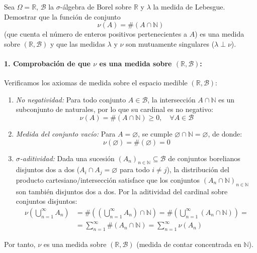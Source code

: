 \begin{problema}
Sea $\Omega = \mathbb{R}$, $\mathcal{B}$ la $\sigma$-álgebra de Borel sobre $\mathbb{R}$ y $\lambda$ la medida de Lebesgue. Demostrar que la función de conjunto
\[
    \nu(A) = \#(A \cap \mathbb{N})
\]
(que cuenta el número de enteros positivos pertenecientes a $A$) es una medida sobre $(\mathbb{R}, \mathcal{B})$ y que las medidas $\lambda$ y $\nu$ son mutuamente singulares ($\lambda \perp \nu$).

\tcblower

\paragraph{1. Comprobación de que $\nu$ es una medida sobre $(\mathbb{R}, \mathcal{B})$:}
Verificamos los axiomas de medida sobre el espacio medible $(\mathbb{R}, \mathcal{B})$:
\begin{enumerate}[label=\alph*)]
    \item \textit{No negatividad:} Para todo conjunto $A \in \mathcal{B}$, la intersección $A \cap \mathbb{N}$ es un subconjunto de naturales, por lo que su cardinal es no negativo:
    \[
        \nu(A) = \#(A \cap \mathbb{N}) \ge 0, \quad \forall A \in \mathcal{B}
    \]
    \item \textit{Medida del conjunto vacío:} Para $A = \varnothing$, se cumple $\varnothing \cap \mathbb{N} = \varnothing$, de donde:
    \[
        \nu(\varnothing) = \#(\varnothing) = 0
    \]
    \item \textit{$\sigma$-aditividad:} Dada una sucesión $(A_n)_{n \in \mathbb{N}} \subseteq \mathcal{B}$ de conjuntos borelianos disjuntos dos a dos ($A_i \cap A_j = \varnothing$ para todo $i \neq j$), la distribución del producto cartesiano/intersección satisface que los conjuntos $(A_n \cap \mathbb{N})_{n \in \mathbb{N}}$ son también disjuntos dos a dos. Por la aditividad del cardinal sobre conjuntos disjuntos:
    \[
    \begin{array}{rl}
        \displaystyle \nu\left( \bigcup_{n=1}^\infty A_n \right) & \displaystyle = \#\left( \left(\bigcup_{n=1}^\infty A_n\right) \cap \mathbb{N} \right) = \#\left( \bigcup_{n=1}^\infty (A_n \cap \mathbb{N}) \right) = \\[16pt]
        & \displaystyle = \sum_{n=1}^\infty \#(A_n \cap \mathbb{N}) = \sum_{n=1}^\infty \nu(A_n)
    \end{array}
    \]
\end{enumerate}
Por tanto, $\nu$ es una medida sobre $(\mathbb{R}, \mathcal{B})$ (medida de contar concentrada en $\mathbb{N}$).


\end{problema}
